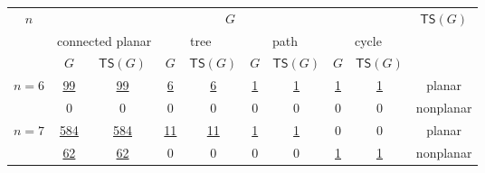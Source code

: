 \documentclass[a4paper]{article}
\theoremstyle{definition}
\theoremstyle{remark}
\numberwithin{equation}{section}
\begin{document}
\begin{table}[!ht]
	\centering
	\begin{tabular}{|c|c|c|c|c|c|c|c|c|c|}
		\hline
		\multirow{3}{*}{$n$}     & \multicolumn{8}{c|}{$G$}                                                                                                   & \multirow{3}{*}{$\mathsf{TS}(G)$} \\ \cline{2-9}
		& \multicolumn{2}{c|}{connected planar} & \multicolumn{2}{c|}{tree} & \multicolumn{2}{c|}{path} & \multicolumn{2}{c|}{cycle} &                                              \\ \cline{2-9}
		& $G$          & $\mathsf{TS}(G)$       & $G$   & $\mathsf{TS}(G)$  & $G$   & $\mathsf{TS}(G)$  & $G$   & $\mathsf{TS}(G)$   &                                              \\ \hline
		\multirow{2}{*}{$n = 6$} & \href{ISReconf/TokenSliding/G.planar_conn.6.planarTS.txt}{99}           & \href{ISReconf/TokenSliding/TSG.planar_conn.6.planar.txt}{99}                     & \href{ISReconf/TokenSliding/G.trees.6.planarTS.txt}{6}     & \href{ISReconf/TokenSliding/TSG.trees.6.planar.txt}{6}                 & \href{ISReconf/TokenSliding/G.path.6.planarTS.txt}{1}     & \href{ISReconf/TokenSliding/TSG.path.6.planar.txt}{1}                 & \href{ISReconf/TokenSliding/G.cycle.6.planarTS.txt}{1}     & \href{ISReconf/TokenSliding/TSG.cycle.6.planar.txt}{1}                  & planar                                       \\ \cline{2-10} 
		& 0            & 0                      & 0     & 0                 & 0     & 0                 & 0     & 0                  & nonplanar                                    \\ \hline
		\multirow{2}{*}{$n = 7$} & \href{ISReconf/TokenSliding/G.planar_conn.7.planarTS.txt}{584}          & \href{ISReconf/TokenSliding/TSG.planar_conn.7.planar.txt}{584}                    & \href{ISReconf/TokenSliding/G.trees.7.planarTS.txt}{11}    & \href{ISReconf/TokenSliding/TSG.planar_conn.7.planar.txt}{11}                & \href{ISReconf/TokenSliding/G.path.7.planarTS.txt}{1}     & \href{ISReconf/TokenSliding/TSG.path.7.planar.txt}{1}                 & 0     & 0                  & planar                                       \\ \cline{2-10} 
		& \href{ISReconf/TokenSliding/G.planar_conn.7.nonplanarTS.txt}{62}           & \href{ISReconf/TokenSliding/TSG.planar_conn.7.kuratowski.txt}{62}                     & 0     & 0                 & 0     & 0                 & \href{ISReconf/TokenSliding/G.cycle.7.nonplanarTS.txt}{1}     & \href{ISReconf/TokenSliding/TSG.cycle.7.kuratowski.txt}{1}                  & nonplanar                                    \\ \hline

\end{tabular}
\end{table}
\end{document}
